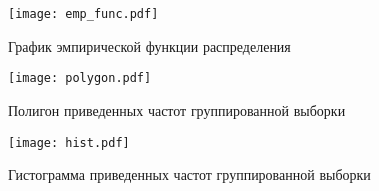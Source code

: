 \documentclass{article}
\begin{document}
  \begin{figure}[ht]
    \centering
    \texttt{[image: emp\_func.pdf]}
    \caption{График эмпирической функции распределения}\label{fig:emp}
  \end{figure}

  \begin{figure}[ht]
    \centering
    \texttt{[image: polygon.pdf]}
    \caption{Полигон приведенных частот группированной выборки}\label{fig:polygon}
  \end{figure}

  \begin{figure}[ht]
    \centering
    \texttt{[image: hist.pdf]}
    \caption{Гистограмма приведенных частот группированной выборки}\label{fig:hist}
  \end{figure}
  
\end{document}
